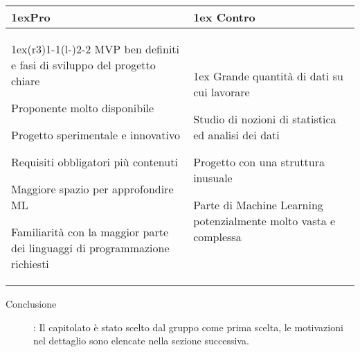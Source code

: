\begin{table}[h]
\begin{tabularx}{\linewidth}{>{\parskip1ex}X@{\kern4\tabcolsep}>{\parskip1ex}X}
\hfil\bfseries Pro
&
\hfil\bfseries Contro
\\\cmidrule(r{3\tabcolsep}){1-1}\cmidrule(l{-\tabcolsep}){2-2}
MVP ben definiti e fasi di sviluppo del progetto chiare \par
Proponente molto disponibile \par
Progetto sperimentale e innovativo \par
Requisiti obbligatori più contenuti \par 
Maggiore spazio per approfondire ML \par
Familiarità con la maggior parte dei linguaggi di programmazione richiesti
&
Grande quantità di dati su cui lavorare \par
Studio di nozioni di statistica ed analisi dei dati \par
Progetto con una struttura inusuale \par
Parte di Machine Learning potenzialmente molto vasta e complessa \\
\end{tabularx}
\end{table}
\begin{description}
	\item [Conclusione]: Il capitolato è stato scelto dal gruppo come prima scelta, le motivazioni nel dettaglio sono elencate nella sezione successiva.
\end{description}

\vspace{1cm}

